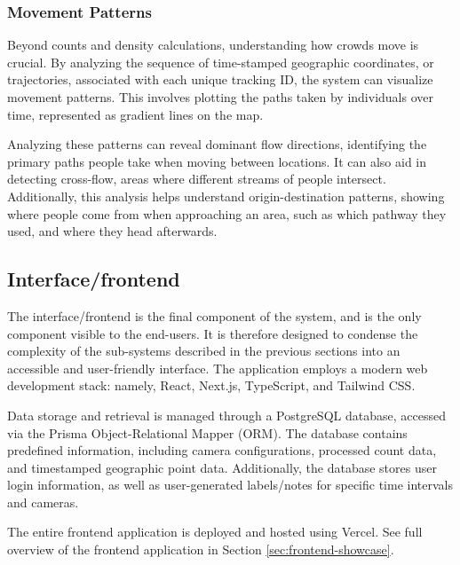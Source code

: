 \subsubsection{Movement Patterns}

Beyond counts and density calculations, understanding how crowds move is crucial. By analyzing the sequence of time-stamped geographic coordinates, or trajectories, associated with each unique tracking ID, the system can visualize movement patterns. This involves plotting the paths taken by individuals over time, represented as gradient lines on the map.

Analyzing these patterns can reveal dominant flow directions, identifying the primary paths people take when moving between locations. It can also aid in detecting cross-flow, areas where different streams of people intersect. Additionally, this analysis helps understand origin-destination patterns, showing where people come from when approaching an area, such as which pathway they used, and where they head afterwards.


\subsection{Interface/frontend}
\label{sec:frontend}

The interface/frontend is the final component of the system, and is the only component visible to the end-users. It is therefore designed to condense the complexity of the sub-systems described in the previous sections into an accessible and user-friendly interface. The application employs a modern web development stack: namely, React, Next.js, TypeScript, and Tailwind CSS.

Data storage and retrieval is managed through a PostgreSQL database, accessed via the Prisma Object-Relational Mapper (ORM). The database contains predefined information, including camera configurations, processed count data, and timestamped geographic point data. Additionally, the database stores user login information, as well as user-generated labels/notes for specific time intervals and cameras.

The entire frontend application is deployed and hosted using Vercel. See full overview of the frontend application in Section \ref{sec:frontend-showcase}.
